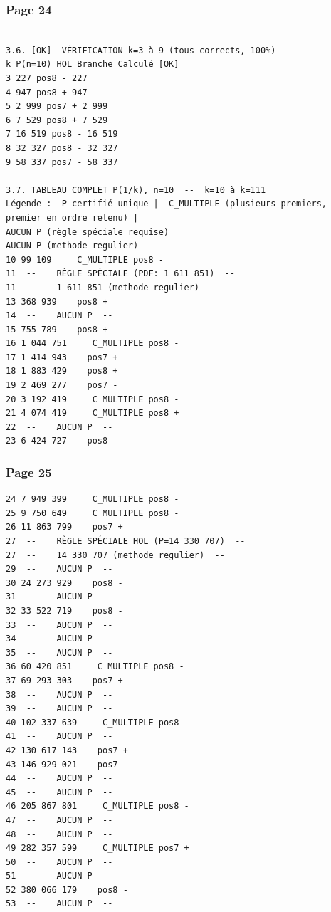 \documentclass[11pt,a4paper]{article}
\begin{document}
\subsubsection*{Page 24}
\begin{Verbatim}[fontsize=\footnotesize]
 
3.6. [OK]  VÉRIFICATION k=3 à 9 (tous corrects, 100%) 
k P(n=10) HOL Branche Calculé [OK] 
3 227 pos8 - 227    
4 947 pos8 + 947    
5 2 999 pos7 + 2 999    
6 7 529 pos8 + 7 529    
7 16 519 pos8 - 16 519    
8 32 327 pos8 - 32 327    
9 58 337 pos7 - 58 337    
 
3.7. TABLEAU COMPLET P(1/k), n=10  --  k=10 à k=111 
Légende :  P certifié unique |  C_MULTIPLE (plusieurs premiers, premier en ordre retenu) |  
AUCUN P (règle spéciale requise) 
AUCUN P (methode regulier)
10 99 109     C_MULTIPLE pos8 - 
11  --    RÈGLE SPÉCIALE (PDF: 1 611 851)  --  
11  --    1 611 851 (methode regulier)  --
13 368 939    pos8 + 
14  --    AUCUN P  --  
15 755 789    pos8 + 
16 1 044 751     C_MULTIPLE pos8 - 
17 1 414 943    pos7 + 
18 1 883 429    pos8 + 
19 2 469 277    pos7 - 
20 3 192 419     C_MULTIPLE pos8 - 
21 4 074 419     C_MULTIPLE pos8 + 
22  --    AUCUN P  --  
23 6 424 727    pos8 - 
\end{Verbatim}
\medskip
\subsubsection*{Page 25}
\begin{Verbatim}[fontsize=\footnotesize]
24 7 949 399     C_MULTIPLE pos8 - 
25 9 750 649     C_MULTIPLE pos8 - 
26 11 863 799    pos7 + 
27  --    RÈGLE SPÉCIALE HOL (P=14 330 707)  --  
27  --    14 330 707 (methode regulier)  --
29  --    AUCUN P  --  
30 24 273 929    pos8 - 
31  --    AUCUN P  --  
32 33 522 719    pos8 - 
33  --    AUCUN P  --  
34  --    AUCUN P  --  
35  --    AUCUN P  --  
36 60 420 851     C_MULTIPLE pos8 - 
37 69 293 303    pos7 + 
38  --    AUCUN P  --  
39  --    AUCUN P  --  
40 102 337 639     C_MULTIPLE pos8 - 
41  --    AUCUN P  --  
42 130 617 143    pos7 + 
43 146 929 021    pos7 - 
44  --    AUCUN P  --  
45  --    AUCUN P  --  
46 205 867 801     C_MULTIPLE pos8 - 
47  --    AUCUN P  --  
48  --    AUCUN P  --  
49 282 357 599     C_MULTIPLE pos7 + 
50  --    AUCUN P  --  
51  --    AUCUN P  --  
52 380 066 179    pos8 - 
53  --    AUCUN P  --  
\end{Verbatim}
\medskip
\end{document}
